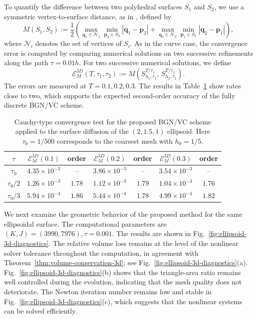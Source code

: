 \documentclass[smallextended]{svjour3}
\numberwithin{equation}{section}
\begin{document}
To quantify the difference between two polyhedral surfaces $S_1$ and $S_2$, we use a symmetric vertex-to-surface distance, as in \cite{bao2021structure}, defined by
\[
M(S_1,S_2) := \frac{1}{2}\left(
\max_{\mathbf{q}_1 \in \mathcal{N}_1} \min_{\mathbf{p}_2 \in S_2} |\mathbf{q}_1 - \mathbf{p}_2|
+
\max_{\mathbf{q}_2 \in \mathcal{N}_2} \min_{\mathbf{p}_1 \in S_1} |\mathbf{q}_2 - \mathbf{p}_1|
\right),
\]
where $\mathcal{N}_i$ denotes the set of vertices of $S_i$. As in the curve case, the convergence error is computed by comparing numerical solutions on two successive refinements along the path $\tau=0.01h$. For two successive numerical solutions, we define
\[
\mathcal{E}^{3D}_{M}(T,\tau_1, \tau_2)
:=
M\!\left(S^{T/{\tau_1}}_{h_1,\tau_1},\, S^{T/{\tau_2}}_{h_2,\tau_{2}}\right).
\]
The errors are measured at $T=0.1,0.2,0.3$. The results in Table~\ref{tab:3d-convergence} show rates close to two, which supports the expected second-order accuracy of the fully discrete BGN/VC scheme.
\begin{table}[H]
	\centering
	\renewcommand{\arraystretch}{1.2}
	\caption{Cauchy-type convergence test for the proposed BGN/VC scheme applied to the surface diffusion of the $(2,1.5,1)$ ellipsoid. Here $\tau_0=1/500$ corresponds to the coarsest mesh with $h_0=1/5$.}
	\label{tab:3d-convergence}
	\begin{tabular}{c|cc|cc|cc}
		\hline
		$\tau$
		& $\mathcal{E}^{3D}_{M}(0.1)$ & order
		& $\mathcal{E}^{3D}_{M}(0.2)$ & order
		& $\mathcal{E}^{3D}_{M}(0.3)$ & order\\
		\hline
		$\tau_0$     & $4.35\times10^{-3}$ & -- 
		& $3.86\times10^{-3}$ & -- 
		& $3.54\times10^{-3}$ & -- \\
		$\tau_0/2$   & $1.26\times10^{-3}$ & $1.78$
		& $1.12\times10^{-3}$ & $1.79$
		& $1.04\times10^{-3}$ & $1.76$ \\
		$\tau_0/3$   & $5.94\times10^{-4}$ & $1.86$
		& $5.44\times10^{-4}$ & $1.78$
		& $4.99\times10^{-4}$ & $1.82$ \\
		\hline
	\end{tabular}
\end{table}

We next examine the geometric behavior of the proposed method for the same ellipsoidal surface. The computational parameters are
$
(K,J)=(3990,7976), \tau=0.001.$
The results are shown in Fig.~\ref{fig:ellipsoid-3d-diagnostics}. The relative volume loss remains at the level of the nonlinear solver tolerance throughout the computation, in agreement with Theorem~\ref{thm:volume-conservation-3d}; see Fig.~\ref{fig:ellipsoid-3d-diagnostics}(a). Fig.~\ref{fig:ellipsoid-3d-diagnostics}(b) shows that the triangle-area ratio remains well controlled during the evolution, indicating that the mesh quality does not deteriorate. The Newton iteration number remains low and stable in Fig.~\ref{fig:ellipsoid-3d-diagnostics}(c), which suggests that the nonlinear systems can be solved efficiently.
\end{document}
